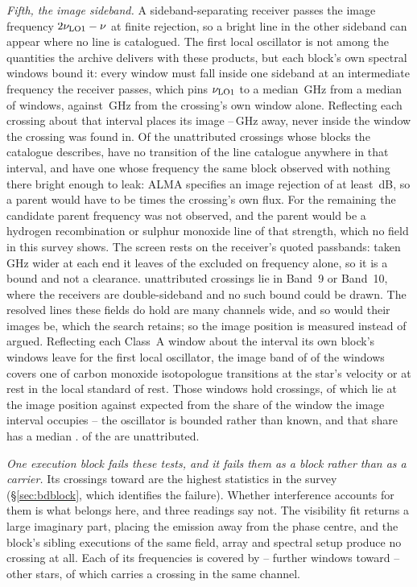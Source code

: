 \emph{Fifth, the image sideband.} A sideband-separating receiver passes the
image frequency $2\nu_{\rm LO1}-\nu$ at finite rejection, so a bright line
in the other sideband can appear where no line is catalogued. The first
local oscillator is not among the quantities the archive delivers with these
products, but each block's own spectral windows bound it: every window must
fall inside one sideband at an intermediate frequency the receiver passes,
which pins $\nu_{\rm LO1}$ to a median \ImLoWidthBlkGHz\,GHz from a median
of \ImNWinUsed{} windows, against \ImLoWidthOwnGHz\,GHz from the crossing's
own window alone. Reflecting each crossing about that interval places its
image \ImGapLoGHz--\ImGapHiGHz\,GHz away, never inside the window the
crossing was found in. Of the \ImNScreen{} unattributed crossings whose
blocks the catalogue describes, \ImNNoParent{} have no transition of the
line catalogue anywhere in that interval, and \ImNParentAbsent{} have one
whose frequency the same block observed with nothing there bright enough to
leak: ALMA specifies an image rejection of at least \ImIrrDb\,dB, so a
parent would have to be \ImIrrFac{} times the crossing's own flux. For the
remaining \ImNLeft{} the candidate parent frequency was not observed, and
the parent would be a hydrogen recombination or sulphur monoxide line of
that strength, which no field in this survey shows. The screen rests on the
receiver's quoted passbands: taken \ImWideGHz\,GHz wider at each end it
leaves \ImNNoParentWide{} of the \ImNScreen{} excluded on frequency alone,
so it is a bound and not a clearance. \ImNDsb{} unattributed crossings lie
in Band~9 or Band~10, where the receivers are double-sideband and no such
bound could be drawn. The resolved lines these fields do hold are many
channels wide, and so would their images be, which the search retains; so the
image position is measured instead of argued. Reflecting each Class~A window
about the interval its own block's windows leave for the first local
oscillator, the image band of \ScImNCov{} of the \ScImNWin{} windows covers one
of \ScImNCo{} carbon monoxide isotopologue transitions at the star's velocity or
at rest in the local standard of rest. Those windows hold \ScImNCross{}
crossings, of which \ScImNHitCross{} lie at the image position against
\ScImExp{} expected from the share of the window the image interval occupies --
the oscillator is bounded rather than known, and that share has a median
\ScImShareMed. \ScImNHitUn{} of the \ScImNHitCross{} are unattributed.

\emph{One execution block fails these tests, and it fails them as a block
rather than as a carrier.} Its \DqBlockNCross{} crossings toward
\LgVerRejectStar{} are the \DqBlockNCross{} highest statistics in the survey
(\S\ref{sec:bdblock}, which identifies the failure). Whether interference
accounts for them is what belongs here, and three readings say not. The
visibility fit returns a large imaginary part,
placing the emission away from the phase centre, and the block's
\BdNSibling{} sibling executions of the same field, array and spectral setup
produce no crossing at all. Each of its frequencies is covered by
\DqOtherWinLo--\DqOtherWinHi{} further windows toward
\DqOtherStarLo--\DqOtherStarHi{} other stars, of which \DqOtherSame{} carries
a crossing in the same channel.

